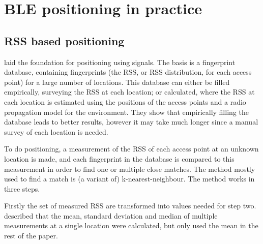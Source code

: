 \chapter{BLE positioning in practice}
\label{chap:architecture}

\section{RSS based positioning}
\label{sec:architecture-rss-based-positioning}
\citet{bahl2000radar} laid the foundation for positioning using \wifi signals.
The basis is a fingerprint database, containing fingerprints (the RSS, or RSS distribution, for each access point) for a large number of locations.
This database can either be filled empirically, surveying the RSS at each location; or calculated, where the RSS at each location is estimated using the positions of the access points and a radio propagation model for the environment.
They show that empirically filling the database leads to better results, however it may take much longer since a manual survey of each location is needed.

To do positioning, a measurement of the RSS of each access point at an unknown location is made, and each fingerprint in the database is compared to this measurement in order to find one or multiple close matches.
The method mostly used to find a match is (a variant of) k-nearest-neighbour.
The method works in three steps.

Firstly the set of measured RSS are transformed into values needed for step two.
\citet{bahl2000radar} described that the mean, standard deviation and median of multiple measurements at a single location were calculated, but only used the mean in the rest of the paper.

